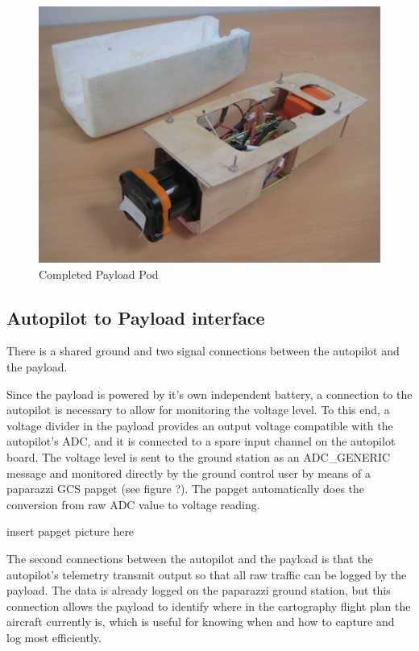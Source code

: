 \documentclass[a4paper,11pt]{report}
\begin{document}
\begin{figure}[ht]
 \centering
 \includegraphics[width=12cm]{Mentor1_payload2.jpg}
 \caption{Completed Payload Pod}
 \label{fig:payload}
\end{figure}

\subsection{Autopilot to Payload interface}

There is a shared ground and two signal connections between the autopilot and the payload.

Since the payload is powered by it's own independent battery, a connection to the autopilot is necessary to allow for monitoring the voltage level. To this end, a voltage divider in the payload provides an output voltage compatible with the autopilot's ADC, and it is connected to a spare input channel on the autopilot board. The voltage level is sent to the ground station as an ADC\_GENERIC message and monitored directly by the ground control user by means of a paparazzi GCS papget (see figure ?). The papget automatically does the conversion from raw ADC value to voltage reading.

insert papget picture here

The second connections between the autopilot and the payload is that the autopilot's telemetry transmit output so that all raw traffic can be logged by the payload. The data is already logged on the paparazzi ground station, but this connection allows the payload to identify where in the cartography flight plan the aircraft currently is, which is useful for knowing when and how to capture and log most efficiently.
\end{document}
